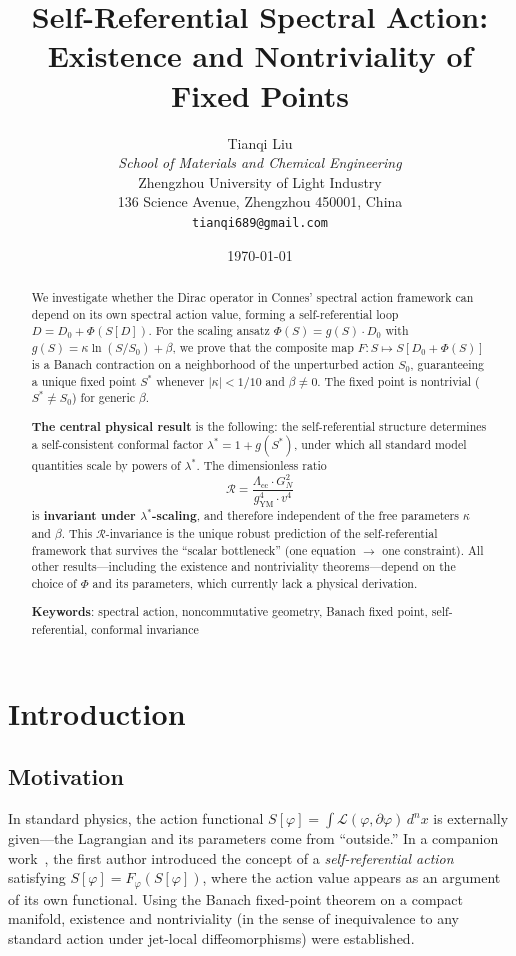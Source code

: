 \documentclass[11pt,a4paper]{article}
\title{\textbf{Self-Referential Spectral Action: \\
Existence and Nontriviality of Fixed Points}}
\author{Tianqi Liu\\
  \textit{School of Materials and Chemical Engineering}\\
  Zhengzhou University of Light Industry\\
  136 Science Avenue, Zhengzhou 450001, China\\
  \texttt{tianqi689@gmail.com}}
\date{\today}
\theoremstyle{remark}
\newcommand{\R}{\mathcal{R}}
\newcommand{\Lcc}{\Lambda_{\mathrm{cc}}}
\newcommand{\GN}{G_N}
\newcommand{\gYM}{g_{\mathrm{YM}}}
\begin{document}
\maketitle

\begin{abstract}
We investigate whether the Dirac operator in Connes' spectral action framework can depend on its own spectral action value, forming a self-referential loop $D = D_0 + \Phi(S[D])$. For the scaling ansatz $\Phi(S) = g(S) \cdot D_0$ with $g(S) = \kappa \ln(S/S_0) + \beta$, we prove that the composite map $F: S \mapsto S[D_0 + \Phi(S)]$ is a Banach contraction on a neighborhood of the unperturbed action $S_0$, guaranteeing a unique fixed point $S^*$ whenever $|\kappa| < 1/10$ and $\beta \neq 0$. The fixed point is nontrivial ($S^* \neq S_0$) for generic $\beta$.

\medskip

\noindent\textbf{The central physical result} is the following: the self-referential structure determines a self-consistent conformal factor $\lambda^* = 1 + g(S^*)$, under which all standard model quantities scale by powers of $\lambda^*$. The dimensionless ratio
\[
  \R = \frac{\Lcc \cdot \GN^2}{\gYM^4 \cdot v^4}
\]
is \textbf{invariant under $\lambda^*$-scaling}, and therefore independent of the free parameters $\kappa$ and $\beta$. This $\R$-invariance is the unique robust prediction of the self-referential framework that survives the ``scalar bottleneck'' (one equation $\to$ one constraint). All other results---including the existence and nontriviality theorems---depend on the choice of $\Phi$ and its parameters, which currently lack a physical derivation.

\medskip

\noindent\textbf{Keywords}: spectral action, noncommutative geometry, Banach fixed point, self-referential, conformal invariance
\end{abstract}

\section{Introduction}

\subsection{Motivation}

In standard physics, the action functional $S[\varphi] = \int \mathcal{L}(\varphi, \partial\varphi)\,d^nx$ is externally given---the Lagrangian and its parameters come from ``outside.'' In a companion work~\cite{PaperI}, the first author introduced the concept of a \emph{self-referential action} satisfying $S[\varphi] = F_\varphi(S[\varphi])$, where the action value appears as an argument of its own functional. Using the Banach fixed-point theorem on a compact manifold, existence and nontriviality (in the sense of inequivalence to any standard action under jet-local diffeomorphisms) were established.
\end{document}
